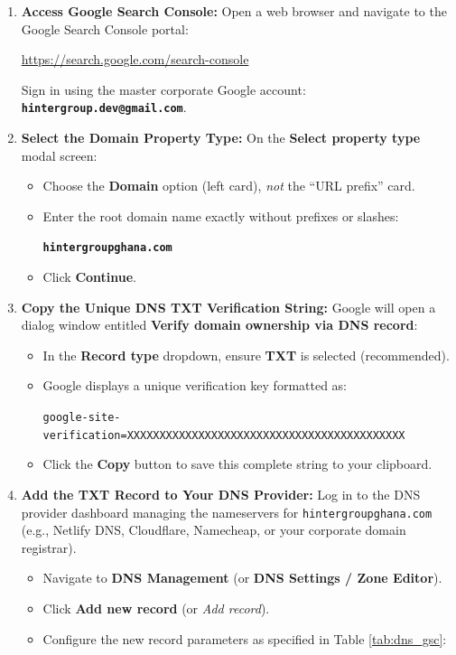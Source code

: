 \documentclass[11pt,a4paper,oneside]{book}
\begin{document}
\begin{enumerate}[leftmargin=*,label=\textbf{Step \arabic*:}]
  \item \textbf{Access Google Search Console:}
    Open a web browser and navigate to the Google Search Console portal:
    \begin{center}
      \url{https://search.google.com/search-console}
    \end{center}
    Sign in using the master corporate Google account:\\
    \textbf{\texttt{hintergroup.dev@gmail.com}}.

  \item \textbf{Select the Domain Property Type:}
    On the \textbf{Select property type} modal screen:
    \begin{itemize}[leftmargin=1.2cm]
      \item Choose the \textbf{Domain} option (left card), \textit{not} the ``URL prefix'' card.
      \item Enter the root domain name exactly without prefixes or slashes:
        \begin{center}
          \Large\bfseries\texttt{hintergroupghana.com}
        \end{center}
      \item Click \textbf{Continue}.
    \end{itemize}

  \item \textbf{Copy the Unique DNS TXT Verification String:}
    Google will open a dialog window entitled \textbf{Verify domain ownership via DNS record}:
    \begin{itemize}[leftmargin=1.2cm]
      \item In the \textbf{Record type} dropdown, ensure \textbf{TXT} is selected (recommended).
      \item Google displays a unique verification key formatted as:
        \begin{center}
          \small\texttt{google-site-verification=XXXXXXXXXXXXXXXXXXXXXXXXXXXXXXXXXXXXXXXXXXX}
        \end{center}
      \item Click the \textbf{Copy} button to save this complete string to your clipboard.
    \end{itemize}

  \item \textbf{Add the TXT Record to Your DNS Provider:}
    Log in to the DNS provider dashboard managing the nameservers for \texttt{hintergroupghana.com} (e.g., Netlify DNS, Cloudflare, Namecheap, or your corporate domain registrar).
    \begin{itemize}[leftmargin=1.2cm]
      \item Navigate to \textbf{DNS Management} (or \textbf{DNS Settings / Zone Editor}).
      \item Click \textbf{Add new record} (or \textit{Add record}).
      \item Configure the new record parameters as specified in Table \ref{tab:dns_gsc}:
    \end{itemize}


\end{enumerate}
\end{document}
